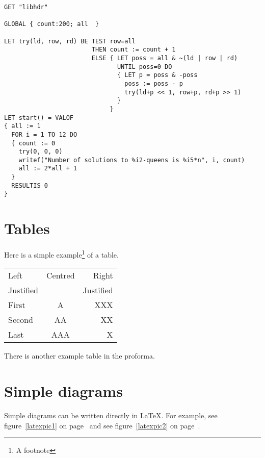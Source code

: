 \documentclass[12pt,a4paper,twoside,openright]{report}
\renewcommand{\baselinestretch}{1.1}    %
\begin{document}
{\renewcommand{\baselinestretch}{0.8}\small
\begin{verbatim}
GET "libhdr"
 
GLOBAL { count:200; all  }
 
LET try(ld, row, rd) BE TEST row=all
                        THEN count := count + 1
                        ELSE { LET poss = all & ~(ld | row | rd)
                               UNTIL poss=0 DO
                               { LET p = poss & -poss
                                 poss := poss - p
                                 try(ld+p << 1, row+p, rd+p >> 1)
                               }
                             }
LET start() = VALOF
{ all := 1
  FOR i = 1 TO 12 DO
  { count := 0
    try(0, 0, 0)
    writef("Number of solutions to %i2-queens is %i5*n", i, count)
    all := 2*all + 1
  }
  RESULTIS 0
}
\end{verbatim}
}

\section{Tables}

\begin{samepage}
Here is a simple example\footnote{A footnote} of a table.

\begin{center}
\begin{tabular}{l|c|r}
Left      & Centred & Right \\
Justified &         & Justified \\[3mm]
First     & A       & XXX \\
Second    & AA      & XX  \\
Last      & AAA     & X   \\
\end{tabular}
\end{center}

\noindent
There is another example table in the proforma.
\end{samepage}

\section{Simple diagrams}

Simple diagrams can be written directly in \LaTeX.  For example, see
figure~\ref{latexpic1} on page~\pageref{latexpic1} and see
figure~\ref{latexpic2} on page~\pageref{latexpic2}.
\end{document}
